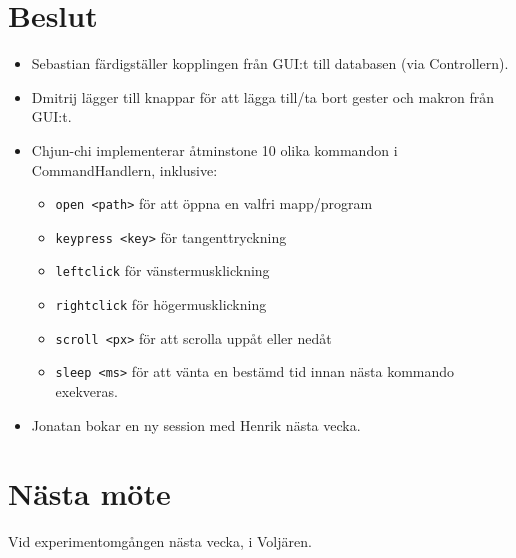 \documentclass[a4paper,12pt]{article}
\begin{document}
\section{Beslut}
\begin{itemize}
\item Sebastian färdigställer kopplingen från GUI:t till databasen (via Controllern).
\item Dmitrij lägger till knappar för att lägga till/ta bort gester och makron från GUI:t.
\item Chjun-chi implementerar åtminstone 10 olika kommandon i CommandHandlern, inklusive:
\begin{itemize}
\item \texttt{open <path>} för att öppna en valfri mapp/program
\item \texttt{keypress <key>} för tangenttryckning
\item \texttt{leftclick} för vänstermusklickning
\item \texttt{rightclick} för högermusklickning
\item \texttt{scroll <px>} för att scrolla uppåt eller nedåt
\item \texttt{sleep <ms>} för att vänta en bestämd tid innan nästa kommando exekveras.
\end{itemize}
\item Jonatan bokar en ny session med Henrik nästa vecka.
\end{itemize}

\section{Nästa möte}
Vid experimentomgången nästa vecka, i Voljären.
\end{document}
